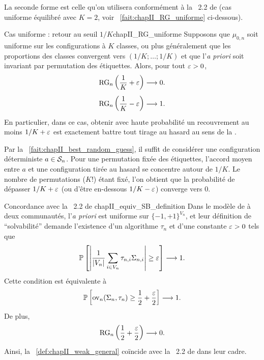 La seconde forme est celle qu'on utilisera conformément à la \Def~2.2 de \SB{} \cite{SankararamanBaccelli2018} (cas uniforme équilibré avec $K=2$, voir \Fact~\ref{fait:chapII_RG_uniforme} ci-dessous). %

\begin{Fait}{Cas uniforme : retour au seuil $1/K$}{chapII_RG_uniforme}
Supposons que $\mu_{0,n}$ soit uniforme sur les configurations à $K$ classes, ou plus généralement que les proportions des classes convergent vers $(1/K ; \ldots ;1/K)$ et que l'\emph{a priori} soit invariant par permutation des étiquettes. Alors, pour tout $\varepsilon>0$,
\[
    \operatorname{RG}_n\left(\frac1K+\varepsilon\right)\longrightarrow0.
\]\[
    \operatorname{RG}_n\left(\frac1K-\varepsilon\right)\longrightarrow1.
\]
En particulier, dans ce cas, obtenir avec haute probabilité un recouvrement au moins $1/K+\varepsilon$ est exactement battre tout tirage au hasard au sens de la .
\end{Fait}

\begin{Preuve}
Par la \Fact~\ref{fait:chapII_best_random_guess}, il suffit de considérer une configuration déterministe $a\in\mathcal S_n$. Pour une permutation fixée des étiquettes, l'accord moyen entre $a$ et une configuration tirée au hasard se concentre autour de $1/K$. Le nombre de permutations ($K!$) étant fixé, l'on obtient que la probabilité de dépasser $1/K+\varepsilon$ (ou d'être en-dessous $1/K-\varepsilon$) converge vers $0$.
\end{Preuve}

\begin{Fait}{Concordance avec la \Def~2.2 de  \cite{SankararamanBaccelli2018}}{chapII_equiv_SB_definition}
Dans le modèle de \SB{} à deux communautés, l'\emph{a priori} est uniforme sur $\{-1,+1\}^{V_n}$, et leur définition de ``solvabilité'' demande l'existence d'un algorithme $\tau_n$ et d'une constante $\varepsilon>0$ tels que
\begin{equation}
    \mathbb P\left[\left|\frac1{|V_n|}\sum_{i\in V_n}\tau_{n,i}\Sigma_{n,i}\right|\ge \varepsilon\right]\longrightarrow1.
    \label{eq:chapII_SB_definition_rewrite}
\end{equation}
Cette condition est équivalente à
\begin{equation}
    \mathbb P\left[\operatorname{ov}_n(\Sigma_n,\tau_n)\ge \frac12+\frac {\varepsilon} 2\right]\longrightarrow1.
    \label{eq:chapII_SB_definition_overlap}
\end{equation}
De plus,
\begin{equation}
    \operatorname{RG}_n\left(\frac12+\frac {\varepsilon} 2\right)\longrightarrow0.
    \label{eq:chapII_SB_RG_zero}
\end{equation}
Ainsi, la \Def~\ref{def:chapII_weak_general} coïncide avec la \Def~2.2 de \SB{} dans leur cadre.
\end{Fait}

